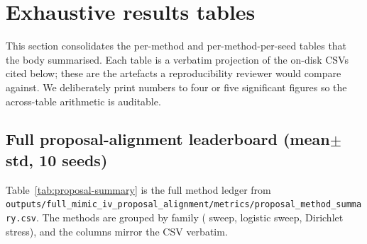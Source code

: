 \section{Exhaustive results tables}
\label{sec:exhaustive-tables}

This section consolidates the per-method and per-method-per-seed
tables that the body summarised. Each table is a verbatim
projection of the on-disk CSVs cited below; these are the artefacts a
reproducibility reviewer would compare against. We deliberately
print numbers to four or five significant figures so the
across-table arithmetic is auditable.

\subsection{Full proposal-alignment leaderboard (mean$\pm$std, 10 seeds)}

Table~\ref{tab:proposal-summary} is the full method ledger from
\texttt{outputs/full\_mimic\_iv\_proposal\_alignment/metrics/proposal\_method\_summary.csv}.
The methods are grouped by family (\fedprox{} sweep, logistic sweep,
Dirichlet stress), and the columns mirror the CSV verbatim.

